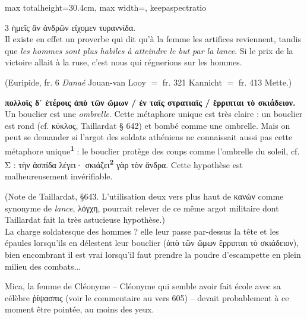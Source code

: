 \documentclass[11pt,twoside]{book}
\newcommand{\italique}[1]{\textit{#1}}
\newcommand{\marqueur}[1]{\textsuperscript{\color{rubricRed}\textbf{#1}}}
\begin{document}
\begin{adjustbox}{max totalheight=30.4cm, max width=\textwidth, keepaspectratio}
\begin{minipage}{\textwidth}
{\begin{multicols}{3}
{ἡμεῖς ἂν ἀνδρῶν εἴχομεν τυραννίδα.\\
Il existe en effet un proverbe qui dit qu'à la femme les artifices reviennent, tandis que \italique{les hommes sont plus habiles à atteindre le but par la lance}. Si le prix de la victoire allait à la ruse, c'est nous qui régnerions sur les hommes.}
\par\vspace{1.5pt}
\noindent (Euripide, fr. 6 \italique{Danaé} Jouan-van Looy $=$ fr. 321 Kannicht $=$ fr. 413 Mette.)
\par\vspace{1.5pt}
 \textbf{πολλοῖς δ᾽ ἑτέροις ἀπὸ τῶν ὤμων / ἐν ταῖς στρατιαῖς / ἔρριπται τὸ σκιάδειον.} Un bouclier est une \italique{ombrelle}. Cette métaphore unique est très claire : un bouclier est rond (cf. κύκλος, Taillardat § 642) et bombé comme une ombrelle. Mais on peut se demander si l'argot des soldats athéniens ne connaissait aussi pas cette métaphore unique\marqueur{1} : le bouclier protège des coups comme l'ombrelle du soleil, cf. Σ : τὴν ἀσπίδα λέγει· σκιάζει\marqueur{2} γὰρ τὸν ἄνδρα. Cette hypothèse est malheureusement invérifiable.
\par\vspace{1.5pt}
\noindent (Note de Taillardat, §643. L'utilisation deux vers plus haut de κανών comme synonyme de \italique{lance}, λόγχη, pourrait relever de ce même argot militaire dont Taillardat fait la très astucieuse hypothèse.)\\ La charge soldatesque des hommes ? elle leur passe par-dessus la tête et les épaules lorsqu'ils en délestent leur bouclier (ἀπὸ τῶν ὤμων ἔρριπται τὸ σκιάδειον), bien encombrant il est vrai lorsqu'il faut prendre la poudre d'escampette en plein milieu des combats...
\par\vspace{1.5pt}
\noindent Mica, la femme de Cléonyme -- Cléonyme qui semble avoir fait école avec sa célèbre ῥίψασπις (voir le commentaire au vers 605) -- devait probablement à ce moment être pointée, au moins des yeux.
\par\vspace{1.5pt}

\end{multicols}}
\end{minipage}
\end{adjustbox}
\end{document}
